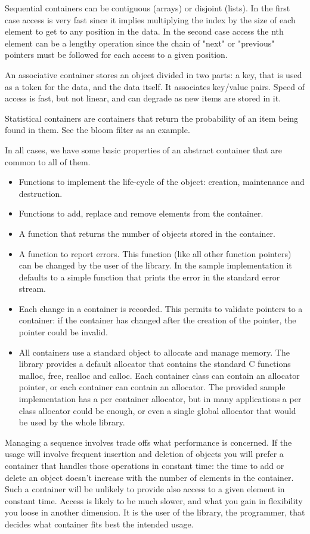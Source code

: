 \documentclass[12pt,a4paper,openany]{memoir} %
\begin{document}
Sequential containers can be contiguous (arrays) or disjoint (lists). In the first case access is very fast since it implies multiplying the index by 
the size of each element to get to any position in the data. In the second case access the nth element can be a lengthy operation since the chain of 
"next" or "previous" pointers must be followed for each access to a given position.

An associative container stores an object divided in two parts: a key, that is used as a token for the data, and the data itself. It associates 
key/value pairs. Speed of access is fast, but not linear, and can degrade as new items are stored in it.

Statistical containers are containers that return the probability of an item being found in them. See the bloom filter as an example.

In all cases, we have some basic properties of an abstract container that are common to all of them. 
\begin{itemize}
\item Functions to implement the life-cycle of the object: creation, maintenance and destruction.
\item Functions to add, replace and remove elements from the container.
\item A function that returns the number of objects stored in the container.
\item
A function to report errors. This function (like all other function pointers) can be changed by the user of the library. In the sample implementation 
it defaults to a simple function that prints the error in the standard error stream. 
\item
Each change in a container is recorded. This permits to validate pointers to a container: if the container has changed after the creation of the pointer, the pointer could be invalid.
\item
All containers use a standard object to allocate and manage memory. The library provides a default allocator that contains the standard C functions malloc, free, realloc and calloc. Each container class can contain an allocator pointer, or each container can contain an allocator. The provided
sample implementation has a per container allocator, but in many applications a per class allocator could be enough, or even a single global allocator
that would be used by the whole library.
\end{itemize}

Managing a sequence involves trade offs what performance is concerned. If the usage will involve frequent insertion and deletion of objects you will 
prefer a container that handles those operations in constant time: the time to add or delete an object doesn't increase with the number of elements in 
the container. Such a container will be unlikely to provide also access to a given element in constant time. Access is likely to be much slower, and 
what you gain in flexibility you loose in another dimension. It is the user of the library, the programmer, that decides what container fits best the 
intended usage.
\end{document}
